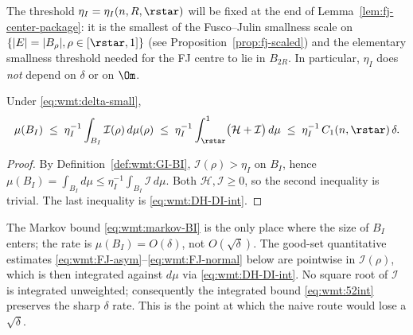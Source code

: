 The threshold $\eta_I=\eta_I(n,R,\rstar)$ will be fixed at the end of
Lemma~\ref{lem:fj-center-package}: it is the smallest of the
Fusco--Julin smallness scale on $\{|E|=|B_\rho|,\rho\in[\rstar,1]\}$ (see
Proposition~\ref{prop:fj-scaled}) and the elementary smallness
threshold needed for the FJ centre to lie in $B_{2R}$. In particular,
$\eta_I$ does \emph{not} depend on $\delta$ or on $\Om$.

\begin{lemma}\label{lem:wmt:markov-BI}
Under \eqref{eq:wmt:delta-small},
\begin{equation}\label{eq:wmt:markov-BI}
   \mu(B_I)
   \;\le\; \eta_I^{-1}\int_{B_I}\mathcal I(\rho)\,d\mu(\rho)
   \;\le\; \eta_I^{-1}\int_{\rstar}^{1}
              \bigl(\mathcal H+\mathcal I\bigr)\,d\mu
   \;\le\; \eta_I^{-1}\,C_1(n,\rstar)\,\delta.
\end{equation}
\end{lemma}

\begin{proof}
By Definition~\ref{def:wmt:GI-BI}, $\mathcal I(\rho)>\eta_I$ on $B_I$,
hence
$\mu(B_I)=\int_{B_I}d\mu \le \eta_I^{-1}\int_{B_I}\mathcal I\,d\mu$.
Both $\mathcal H,\mathcal I\ge 0$, so the second inequality is trivial.
The last inequality is \eqref{eq:wmt:DH-DI-int}.
\end{proof}

\begin{remark}\label{rem:wmt:rate-good-bad}
The Markov bound \eqref{eq:wmt:markov-BI} is the only place where the
size of $B_I$ enters; the rate is $\mu(B_I)=O(\delta)$, not
$O(\sqrt{\delta})$. The good-set quantitative estimates
\eqref{eq:wmt:FJ-asym}--\eqref{eq:wmt:FJ-normal} below are pointwise in
$\mathcal I(\rho)$, which is then integrated against $d\mu$ via
\eqref{eq:wmt:DH-DI-int}. No square root of $\mathcal I$ is integrated
unweighted; consequently the integrated bound \eqref{eq:wmt:52int}
preserves the sharp $\delta$ rate. This is the point at which the
naive route would lose a $\sqrt{\delta}$.
\end{remark}

